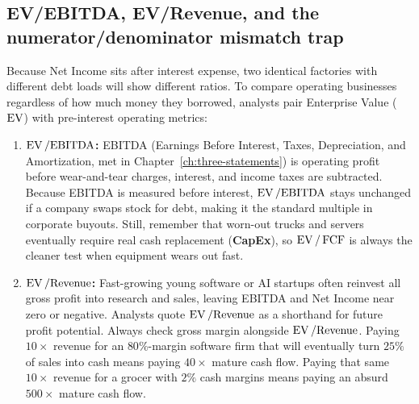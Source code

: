 \subsection{EV/EBITDA, EV/Revenue, and the numerator/denominator mismatch trap}

Because Net Income sits after interest expense, two identical factories with different debt loads will show different  ratios. To compare operating businesses regardless of how much money they borrowed, analysts pair Enterprise Value ($\operatorname{EV}$) with pre-interest operating metrics:
\begin{enumerate}
 \item \textbf{$\operatorname{EV} / \text{EBITDA}$:} EBITDA (Earnings Before Interest, Taxes, Depreciation, and Amortization, met in Chapter~\ref{ch:three-statements}) is operating profit before wear-and-tear charges, interest, and income taxes are subtracted. Because EBITDA is measured before interest, $\operatorname{EV} / \text{EBITDA}$ stays unchanged if a company swaps stock for debt, making it the standard multiple in corporate buyouts. Still, remember that worn-out trucks and servers eventually require real cash replacement (\textbf{CapEx}), so $\operatorname{EV} / \operatorname{FCF}$ is always the cleaner test when equipment wears out fast.
 \item \textbf{$\operatorname{EV} / \text{Revenue}$:} Fast-growing young software or AI startups often reinvest all gross profit into research and sales, leaving EBITDA and Net Income near zero or negative. Analysts quote $\operatorname{EV} / \text{Revenue}$ as a shorthand for future profit potential. Always check gross margin alongside $\operatorname{EV} / \text{Revenue}$. Paying $10\times$ revenue for an $80\%$-margin software firm that will eventually turn $25\%$ of sales into cash means paying $40\times$ mature cash flow. Paying that same $10\times$ revenue for a grocer with $2\%$ cash margins means paying an absurd $500\times$ mature cash flow.
\end{enumerate}

